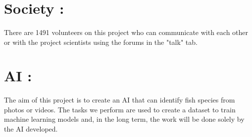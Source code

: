 \documentclass[14pt]
{article}
\begin{document}
\section*{Society :}
\paragraph*{}There are 1491 volunteers on this project who can communicate with each other or with the project scientists using the forums in the "talk" tab.\\

\section*{AI :}
\paragraph*{}The aim of this project is to create an AI that can identify fish species from photos or videos. The tasks we perform are used to create a dataset to train machine learning models and, in the long term, the work will be done solely by the AI developed.\\
\end{document}
